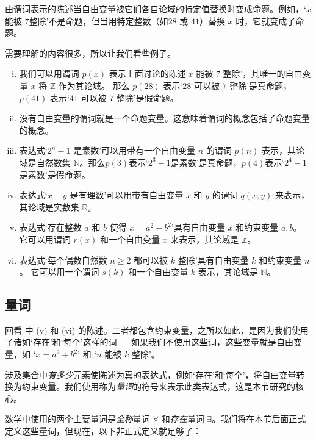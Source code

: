 由谓词表示的陈述当自由变量被它们各自论域的特定值替换时变成命题。例如，`$x$ 能被 $7$整除'不是命题，但当用特定整数（如$28$ 或 $41$）替换 $x$ 时，它就变成了命题。

需要理解的内容很多，所以让我们看些例子。

\begin{example}
\label{exFirstExamplesOfPredicates}
\fixlistskip
\begin{enumerate}[(i)]
\item 我们可以用谓词 $p(x)$ 表示上面讨论的陈述`$x$ 能被 $7$ 整除'，其唯一的自由变量 $x$ 将 $\mathbb{Z}$ 作为其论域。 那么 $p(28)$ 表示`$28$ 可以被 $7$ 整除'是真命题，$p(41)$ 表示`$41$ 可以被 $7$ 整除'是假命题。
\item 没有自由变量的谓词就是一个命题变量。这意味着谓词的概念包括了命题变量的概念。
\item 表达式`$2^n-1$ 是素数'可以用带有一个自由变量 $n$ 的谓词 $p(n)$ 表示，其论域是自然数集 $\mathbb{N}$。那么$p(3)$表示`$2^3-1$是素数'是真命题，$p(4)$表示`$2^4-1$是素数'是假命题。
\item 表达式`$x-y$ 是有理数'可以用带有自由变量 $x$ 和 $y$ 的谓词 $q(x,y)$ 来表示，其论域是实数集 $\mathbb{R}$。
\item 表达式`存在整数 $a$ 和 $b$ 使得 $x = a^2+b^2$'具有自由变量 $x$ 和约束变量 $a,b$。 它可以用谓词 $r(x)$ 和一个自由变量 $x$ 来表示，其论域是 $\mathbb{Z}$。
\item 表达式`每个偶数自然数 $n \ge 2$ 都可以被 $k$ 整除'具有自由变量 $k$ 和约束变量 $n$。 它可以用一个谓词 $s(k)$ 和一个自由变量 $k$ 表示，其论域是 $\mathbb{N}$。
\end{enumerate}
\end{example}


\subsection*{量词}

回看  中 (v) 和 (vi) 的陈述。二者都包含约束变量，之所以如此，是因为我们使用了诸如`存在'和`每个'这样的词 --- 如果我们不使用这些词，这些变量就是自由变量，如 `$x=a^2+b^2$' 和 `$n$ 能被 $k$ 整除'。

涉及集合中\textit{有多少}元素使陈述为真的表达式，例如`存在'和`每个'，将自由变量转换为约束变量。我们使用称为\textit{量词}的符号来表示此类表达式，这是本节研究的核心。

数学中使用的两个主要量词是\textit{全称}量词 $\forall$ 和\textit{存在}量词 $\exists$。我们将在本节后面正式定义这些量词，但现在，以下非正式定义就足够了：


